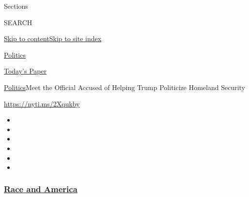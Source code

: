 Sections

SEARCH

\protect\hyperlink{site-content}{Skip to
content}\protect\hyperlink{site-index}{Skip to site index}

\href{https://www.nytimes3xbfgragh.onion/section/politics}{Politics}

\href{https://myaccount.nytimes3xbfgragh.onion/auth/login?response_type=cookie\&client_id=vi}{}

\href{https://www.nytimes3xbfgragh.onion/section/todayspaper}{Today's
Paper}

\href{/section/politics}{Politics}\textbar{}Meet the Official Accused of
Helping Trump Politicize Homeland Security

\url{https://nyti.ms/2Xqukby}

\begin{itemize}
\item
\item
\item
\item
\item
\item
\end{itemize}

\hypertarget{race-and-america}{%
\subsubsection{\texorpdfstring{\href{https://www.nytimes3xbfgragh.onion/news-event/george-floyd-protests-minneapolis-new-york-los-angeles?name=styln-george-floyd\&region=TOP_BANNER\&variant=undefined\&block=storyline_menu_recirc\&action=click\&pgtype=Article\&impression_id=2ce5ae20-e39a-11ea-8c8a-b7fbae24c18c}{Race
and America}}{Race and America}}\label{race-and-america}}

